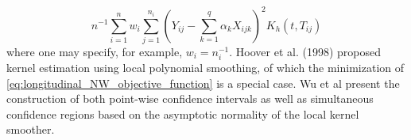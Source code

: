 \documentclass[12pt]{article}
\begin{document}
\begin{equation} \label{eq:longitudinal_NW_objective_function}
n^{-1} \sum_{i=1}^{n} w_i \sum_{j=1}^{n_i} \left(Y_{ij} - \sum_{k=1}^q \alpha_k X_{ijk} \right)^2 K_h\left(t,T_{ij}\right)
\end{equation}
\noindent 
where one may specify, for example, $w_i = n_i^{-1}$. Hoover et al. (1998) proposed kernel estimation using local polynomial smoothing, of which the minimization of \ref{eq:longitudinal_NW_objective_function} is a special case. Wu et al present the construction of both point-wise confidence intervals as well as simultaneous confidence regions based on the asymptotic normality of the local kernel smoother.

 
%

\end{document}
